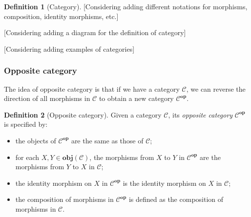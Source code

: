 \documentclass[12pt,twoside,a4paper]{report}
\theoremstyle{definition}
\newtheorem*{definition*}{Definition}
\begin{document}
\begin{definition*}[Category]
            [Considering adding different notations for morphisms, composition, identity morphisms, etc.]

            [Considering adding a diagram for the definition of category]

            [Considering adding examples of categories]

        \end{definition*}

            \subsubsection{Opposite category}
            The idea of opposite category is that if we have a category $\mathcal{C}$, we can reverse the direction of all morphisms in $\mathcal{C}$ to obtain a new category $\mathcal{C}^{\textbf{op}}$.

            \begin{definition*}[Opposite category]
                Given a category $\mathcal{C}$, its \emph{opposite category} $\mathcal{C}^{\textbf{op}}$ is specified by:
                \begin{itemize}
                    \item 
                        the objects of $\mathcal{C}^{\textbf{op}}$ are the same as those of $\mathcal{C}$;
                    \item 
                        for each $X, Y \in \textbf{obj}(\mathcal{C})$, the morphisms from $X$ to $Y$ in $\mathcal{C}^{\textbf{op}}$ are the morphisms from $Y$ to $X$ in $\mathcal{C}$;
                    \item 
                        the identity morphism on $X$ in $\mathcal{C}^{\textbf{op}}$ is the identity morphism on $X$ in $\mathcal{C}$;
                    \item 
                        the composition of morphisms in $\mathcal{C}^{\textbf{op}}$ is defined as the composition of morphisms in $\mathcal{C}$.
                \end{itemize}
            \end{definition*}

\end{document}
